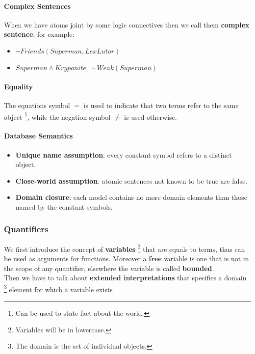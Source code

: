 \documentclass[10pt,a4paper]{article}
\begin{document}
\paragraph{Complex Sentences}
When we have atoms joint by some logic connectives then we call them \textbf{complex sentence}, for example:
\begin{itemize}
\item $\neg Friends(Superman,LexLutor)$
\item $Superman\wedge Kryponite \Rightarrow Weak(Superman)$
\end{itemize}


\paragraph{Equality}
The equations symbol $=$ is used to indicate that two terms refer to the same object \footnote{Can be used to state fact about the world.}, while the negation symbol $\neq$  is used otherwise.


\paragraph{Database Semantics}
\label{sec:database_semantic}
\begin{itemize}
\item \textbf{Unique name assumption}: every constant symbol refers to a distinct object.
\item \textbf{Close-world assumption}: atomic sentences not known to be true are false.
\item \textbf{Domain closure}: each model contains no more domain elements than those named by the constant symbols.
\end{itemize}

\subsubsection{Quantifiers}
\label{sec:quantifiers}
We first introduce the concept of \textbf{variables} \footnote{Variables will be in lowercase.} that are equals to terms, thus can be used as arguments for functions.
Moreover a \textbf{free} variable is one that is not in the scope of any quantifier, elsewhere the variable is called \textbf{bounded}.\\ 
Then we have to talk about \textbf{extended interpretations} that specifies a domain \footnote{The domain is the set of individual objects.} element for which a variable exists
\end{document}
